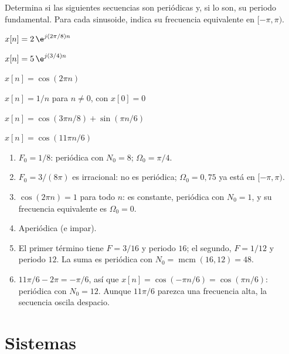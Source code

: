 \documentclass[11pt,a4paper]{scrartcl}
\begin{document}
\begin{ejercicio}
  Determina si las siguientes secuencias son periódicas y, si lo son, su periodo fundamental. Para cada sinusoide, indica su frecuencia equivalente en $[-\pi,\pi)$.
  \begin{incisos}[2]
    \item $x[n]=2\,\e^{j(2\pi/8)n}$
    \item $x[n]=5\,\e^{j(3/4)n}$
    \item $x[n]=\cos(2\pi n)$
    \item $x[n]=1/n$ para $n\ne0$, con $x[0]=0$
    \item $x[n]=\cos(3\pi n/8)+\sin(\pi n/6)$
    \item $x[n]=\cos(11\pi n/6)$
  \end{incisos}
\end{ejercicio}
\begin{solucion}
  \begin{enumerate}[label=\alph*)]
    \item $F_0=1/8$: periódica con $N_0=8$; $\Omega_0=\pi/4$.
    \item $F_0=3/(8\pi)$ es irracional: no es periódica; $\Omega_0=0{,}75$ ya está en $[-\pi,\pi)$.
    \item $\cos(2\pi n)=1$ para todo $n$: es constante, periódica con $N_0=1$, y su frecuencia equivalente es $\Omega_0=0$.
    \item Aperiódica (e impar).
    \item El primer término tiene $F=3/16$ y periodo $16$; el segundo, $F=1/12$ y periodo $12$. La suma es periódica con $N_0=\operatorname{mcm}(16,12)=48$.
    \item $11\pi/6-2\pi=-\pi/6$, así que $x[n]=\cos(-\pi n/6)=\cos(\pi n/6)$: periódica con $N_0=12$. Aunque $11\pi/6$ parezca una frecuencia alta, la secuencia oscila despacio.
  \end{enumerate}
\end{solucion}

\section*{Sistemas}
\end{document}
